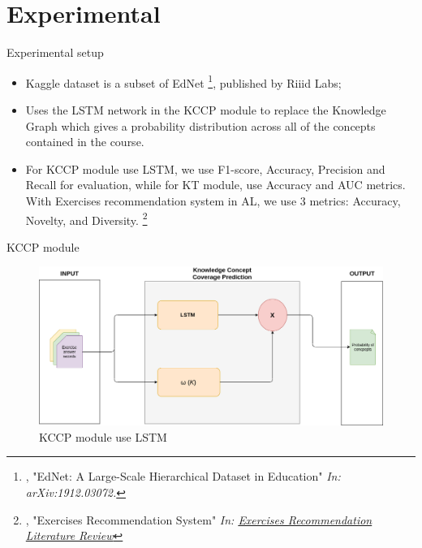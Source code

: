 \documentclass[10pt,a4paper,openany]{beamer}
\begin{document}
	
	
	\section{Experimental} 	
	\begin{frame}{Experimental setup}
		\begin{itemize}
			\item Kaggle dataset is a subset of EdNet \footnote{, "EdNet: A Large-Scale Hierarchical Dataset in Education" \emph{\color{blue} In: arXiv:1912.03072.}}, published by Riiid Labs;
			\item Uses the LSTM network in the KCCP module to replace the Knowledge Graph which gives a probability distribution across all of the concepts contained in the course.
			\item For KCCP module use LSTM, we use F1-score, Accuracy, Precision and Recall for evaluation, while for KT module, use Accuracy and AUC metrics. With Exercises recommendation system in AL, we use 3 metrics: Accuracy, Novelty, and Diversity. \footnote{\text{\color{blue} }, "Exercises Recommendation System" \emph{\color{blue} In: \href{https://docs.google.com/document/d/1J11qjjtteFJDZnR8BaAcA\_ny6hT3wbt-ceO8G7hdKsk/}{Exercises Recommendation Literature Review}}}
		\end{itemize}
	\end{frame}
	
	\begin{frame}{KCCP module}
		\begin{figure}[htbp]
			\centerline{\includegraphics[scale=0.3]{charts/kccp.png}}
			\label{fig_motivation3}
			\caption{KCCP module use LSTM}
		\end{figure}
	\end{frame}
	
\end{document}
